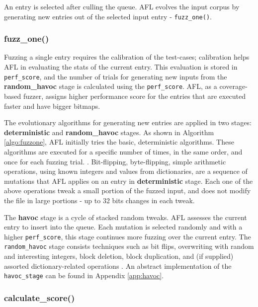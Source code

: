 An entry is selected after culling the queue. AFL evolves the input corpus by generating new entries out of the selected input entry - \texttt{fuzz\_one()}. 

\subsubsection{fuzz\_one()}



Fuzzing a single entry requires the calibration of the test-cases; calibration helps AFL in evaluating the stats of the current entry. This evaluation is stored in \texttt{perf\_score}, and the number of trials for generating new inputs from the \textbf{random\_havoc} stage is calculated using the \texttt{perf\_score}. AFL, as a coverage-based fuzzer, assigns higher performance score for the entries that are executed faster and have bigger bitmaps.

The evolutionary algorithms for generating new entries are applied in two stages: \textbf{deterministic} and \textbf{random\_havoc} stages. As shown in Algorithm \ref{algo:fuzzone}, AFL initially tries the basic, deterministic algorithms. These algorithms are executed for a specific number of times, in the same order, and once for each fuzzing trial. . Bit-flipping, byte-flipping, simple arithmetic operations, using known integers and values from dictionaries, are a sequence of mutations that AFL applies on an entry in \textbf{deterministic} stage. Each one of the above operations tweak a small portion of the fuzzed input, and does not modify the file in large portions - up to 32 bits changes in each tweak.

The \textbf{havoc} stage is a cycle of stacked random tweaks. AFL assesses the current entry to insert into the queue. Each mutation is selected randomly and with a higher \texttt{perf\_score}, this stage continues more fuzzing over the current entry. The \texttt{random\_havoc} stage consists techniques such as bit flips, overwriting with random and interesting integers, block deletion, block duplication, and (if supplied) assorted dictionary-related operations \cite{afl_userguide}. An abstract implementation of the \texttt{havoc\_stage} can be found in Appendix \ref{app:havoc}.

\subsubsection*{calculate\_score()}
\label{sub:calc_score}

